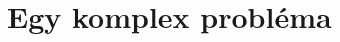 \documentclass[12pt]{book}
\theoremstyle{plain} %
\theoremstyle{definition} %
\newtheorem{theo/}{Tétel}[section]
\newenvironment{theo}
  {\renewcommand{\qedsymbol}{$\clubsuit$}%
   \pushQED{\qed}\begin{theo/}}
  {\popQED\end{theo/}}
\theoremstyle{remark}
\renewcommand\qedsymbol{$\blacksquare$}
\numberwithin{equation}{section}  %
\def\N{\mathbb{N}}
\begin{document}
	\section{Egy komplex probléma}

\end{document}
